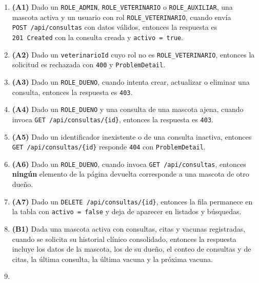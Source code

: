 \documentclass[
  spanish,
]{article}
\providecommand{\tightlist}{%
  \setlength{\itemsep}{0pt}\setlength{\parskip}{0pt}}
\begin{document}
\begin{itemize}
  \begin{enumerate}
  \def\labelenumi{\arabic{enumi}.}
  \tightlist
  \item
    \textbf{(A1)} Dado un \texttt{ROLE\_\allowbreak{}ADMIN},
    \texttt{ROLE\_\allowbreak{}VETERINARIO} o \texttt{ROLE\_\allowbreak{}AUXILIAR}, una mascota
    activa y un usuario con rol \texttt{ROLE\_\allowbreak{}VETERINARIO}, cuando envía
    \texttt{POST\ /\allowbreak{}api/\allowbreak{}consultas} con datos válidos, entonces la
    respuesta es \texttt{201\ Created} con la consulta creada y
    \texttt{activo\ =\ true}.
  \item
    \textbf{(A2)} Dado un \texttt{veterinario\allowbreak{}Id} cuyo rol no es
    \texttt{ROLE\_\allowbreak{}VETERINARIO}, entonces la solicitud es rechazada con
    \texttt{400} y \texttt{Problem\allowbreak{}Detail}.
  \item
    \textbf{(A3)} Dado un \texttt{ROLE\_\allowbreak{}DUENO}, cuando intenta crear,
    actualizar o eliminar una consulta, entonces la respuesta es
    \texttt{403}.
  \item
    \textbf{(A4)} Dado un \texttt{ROLE\_\allowbreak{}DUENO} y una consulta de una
    mascota ajena, cuando invoca \texttt{GET\ /\allowbreak{}api/\allowbreak{}consultas/\allowbreak{}\{id\}},
    entonces la respuesta es \texttt{403}.
  \item
    \textbf{(A5)} Dado un identificador inexistente o de una consulta
    inactiva, entonces \texttt{GET\ /\allowbreak{}api/\allowbreak{}consultas/\allowbreak{}\{id\}} responde
    \texttt{404} con \texttt{Problem\allowbreak{}Detail}.
  \item
    \textbf{(A6)} Dado un \texttt{ROLE\_\allowbreak{}DUENO}, cuando invoca
    \texttt{GET\ /\allowbreak{}api/\allowbreak{}consultas}, entonces \textbf{ningún} elemento de
    la página devuelta corresponde a una mascota de otro dueño.
  \item
    \textbf{(A7)} Dado un \texttt{DELETE\ /\allowbreak{}api/\allowbreak{}consultas/\allowbreak{}\{id\}},
    entonces la fila permanece en la tabla con \texttt{activo\ =\ false}
    y deja de aparecer en listados y búsquedas.
  \item
    \textbf{(B1)} Dada una mascota activa con consultas, citas y vacunas
    registradas, cuando se solicita su historial clínico consolidado,
    entonces la respuesta incluye los datos de la mascota, los de su
    dueño, el conteo de consultas y de citas, la última consulta, la
    última vacuna y la próxima vacuna.
  \item

\end{enumerate}
\end{itemize}
\end{document}
